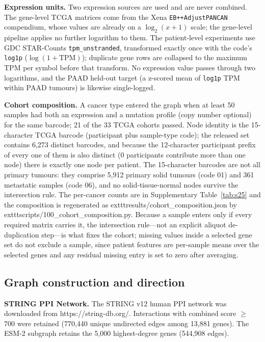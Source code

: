 \documentclass[11pt,a4paper]{article}
\newcommand{\supptab}[1]{Supplementary Table~\ref{#1}}
\begin{document}
\textbf{Expression units.} Two expression sources are used and are never combined. The gene-level TCGA matrices come from the Xena \texttt{EB++AdjustPANCAN} compendium, whose values are already on a $\log_2(x+1)$ scale; the gene-level pipeline applies no further logarithm to them. The patient-level experiments use GDC STAR-Counts \texttt{tpm\_\allowbreak unstranded}, transformed exactly once with the code's \texttt{log1p} ($\log(1+\mathrm{TPM})$); duplicate gene rows are collapsed to the maximum TPM per symbol before that transform. No expression value passes through two logarithms, and the PAAD held-out target (a z-scored mean of \texttt{log1p} TPM within PAAD tumours) is likewise single-logged.

\textbf{Cohort composition.} A cancer type entered the graph when at least 50 samples had both an expression and a mutation profile (copy number optional) for the same barcode; 21 of the 33 TCGA cohorts passed. Node identity is the 15-character TCGA barcode (participant plus sample-type code); the released set contains 6,273 distinct barcodes, and because the 12-character participant prefix of every one of them is also distinct (0 participants contribute more than one node) there is exactly one node per patient. The 15-character barcodes are not all primary tumours: they comprise 5,912 primary solid tumours (code 01) and 361 metastatic samples (code 06), and no solid-tissue-normal nodes survive the intersection rule. The per-cancer counts are in \supptab{tab:s25} and the composition is regenerated as 	exttt{results/cohort\_composition.json} by 	exttt{scripts/100\_cohort\_composition.py}. Because a sample enters only if every required matrix carries it, the intersection rule---not an explicit aliquot de-duplication step---is what fixes the cohort; missing values inside a selected gene set do not exclude a sample, since patient features are per-sample means over the selected genes and any residual missing entry is set to zero after averaging.


\subsection{Graph construction and direction}

\textbf{STRING PPI Network.} The STRING v12 human PPI network was downloaded from https://string-db.org/. Interactions with combined score $\geq$ 700 were retained (770,440 unique undirected edges among 13,881 genes). The ESM-2 subgraph retains the 5,000 highest-degree genes (544,908 edges).
\FloatBarrier
\end{document}

